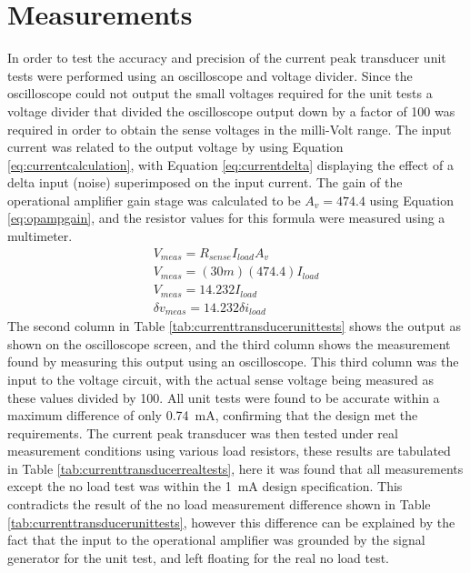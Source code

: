 \section{Measurements} \label{sec:measurements_current_peak_transducer}
In order to test the accuracy and precision of the current peak transducer unit tests were performed using an oscilloscope and voltage divider. Since the oscilloscope could not output the small voltages required for the unit tests a voltage divider that divided the oscilloscope output down by a factor of 100 was required in order to obtain the sense voltages in the milli-Volt range. The input current was related to the output voltage by using Equation \ref{eq:currentcalculation}, with Equation \ref{eq:currentdelta} displaying the effect of a delta input (noise) superimposed on the input current. The gain of the operational amplifier gain stage was calculated to be $A_{v}=474.4$ using Equation \ref{eq:opampgain}, and the resistor values for this formula were measured using a multimeter.
\begin{align}
    V_{meas}=R_{sense}I_{load}A_{v} \nonumber\\
    V_{meas}=(30m)(474.4)I_{load} \nonumber \\
    V_{meas}= 14.232I_{load} \label{eq:currentcalculation} \\
    \delta v_{meas}= 14.232\delta i_{load} \label{eq:currentdelta}
\end{align} 
The second column in Table \ref{tab:currenttransducerunittests} shows the output as shown on the oscilloscope screen, and the third column shows the measurement found by measuring this output using an oscilloscope. This third column was the input to the voltage circuit, with the actual sense voltage being measured as these values divided by 100. All unit tests were found to be accurate within a maximum difference of only \SI{0.74}{\milli A}, confirming that the design met the requirements. \vspace{4mm} \newline 
The current peak transducer was then tested under real measurement conditions using various load resistors, these results are tabulated in Table \ref{tab:currenttransducerrealtests}, here it was found that all measurements except the no load test was within the \SI{1}{\milli A} design specification. This contradicts the result of the no load measurement difference shown in Table \ref{tab:currenttransducerunittests}, however this difference can be explained by the fact that the input to the operational amplifier was grounded by the signal generator for the unit test, and left floating for the real no load test. \vspace{4mm} \newline  
